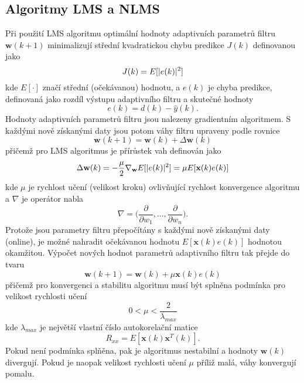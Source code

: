 \subsection{Algoritmy LMS a NLMS} \label{chap:nlms}
 Při použití LMS algoritmu  optimální hodnoty adaptivních parametrů filtru $\textbf{w}(k+1)$ minimalizují střední kvadratickou chybu predikce $J(k)$ definovanou jako
 \begin{equation}
     J(k)=E[\lvert e(k)\rvert^2]
 \end{equation}
 kde $E[\cdot]$ značí střední (očekávanou) hodnotu, a $e(k)$ je chyba predikce, definovaná jako rozdíl výstupu adaptivního filtru a skutečné hodnoty
 \begin{equation}
     e(k)=d(k)-\hat{y}(k).
 \end{equation}
 Hodnoty adaptivních parametrů filtru jsou nalezeny gradientním algoritmem. S každými nově získanými daty jsou potom váhy filtru upraveny podle rovnice
\begin{equation}
    \textbf{w}(k+1)=\textbf{w}(k)+\Delta\textbf{w}(k)
\end{equation}
přičemž pro LMS algoritmus je přírůstek vah definován jako
\begin{equation}
    \Delta\textbf{w}(k)=-\frac{\mu}{2} \nabla_{\textbf{w}} E[\lvert e(k)\rvert^2]=\mu E[\textbf{x}(k)e(k)]
\end{equation}
kde  $\mu$ je rychlost učení (velikost kroku) ovlivňující rychlost konvergence algoritmu a $\nabla$ je operátor nabla
\begin{equation}
    \nabla =\Bigg(\frac{\partial}{\partial w_1},\dots,\frac{\partial}{\partial w_n}\Bigg).
\end{equation}
Protože jsou parametry filtru přepočítány s každými nově získanými daty (online), je možné nahradit očekávanou hodnotu $E[\textbf{x}(k)e(k)]$ hodnotou okamžitou. Výpočet nových hodnot parametrů adaptivního filtru tak přejde do tvaru
\begin{equation}
    \textbf{w}(k+1)=\textbf{w}(k)+\mu\textbf{x}(k)e(k)
\end{equation}
přičemž pro konvergenci a stabilitu algoritmu musí být splněna podmínka pro velikost rychlosti učení
\begin{equation}
    0 < \mu < \frac{2}{\lambda_{max}}
\end{equation}
kde $\lambda_{max}$ je největší vlastní číslo autokorelační matice 
\begin{equation}
    R_{xx}=E[\textbf{x}(k)\textbf{x}^T(k)].
\end{equation}
Pokud není podmínka splňěna, pak je algoritmus nestabilní a hodnoty $\textbf{w}(k)$ divergují. Pokud je naopak velikost rychlosti učení $\mu$ příliž malá, váhy konvergují pomalu.
